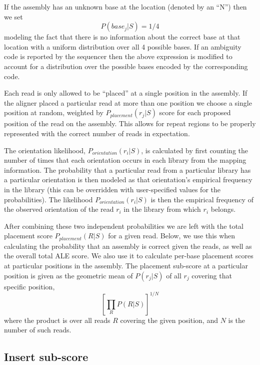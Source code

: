 \documentclass[phd,tocprelim]{cornell}
\begin{document}
If the assembly has an unknown base at the location (denoted by an “N”) then we set
\begin{equation}
    P\left(base_{j}|S\right) = 1/4
\end{equation}
modeling the fact that there is no information about the correct base at that location with a uniform distribution over all 4 possible bases. If an ambiguity code is reported by the sequencer then the above expression is modified to account for a distribution over the possible bases encoded by the corresponding code.

Each read is only allowed to be “placed” at a single position in the assembly. If the aligner placed a particular read at more than one position we choose a single position at random, weighted by $P_{placement}(r_{j}|S)$ score for each proposed position of the read on the assembly. This allows for repeat regions to be properly represented with the correct number of reads in expectation.

The orientation likelihood, $P_{orientation}\left(r_{i}|S\right)$, is calculated by first counting the number of times that each orientation occurs in each library from the mapping information.  The probability that a particular read from a particular library has a particular orientation is then modeled as that orientation’s empirical frequency in the library (this can be overridden with user-specified values for the probabilities).   The likelihood $P_{orientation}\left(r_{i}|S\right)$ is then the empirical frequency of the observed orientation of the read $r_{i}$ in the library from which $r_{i}$ belongs.

After combining these two independent probabilities we are left with the total placement score $P_{placement}(R|S)$ for a given read.  Below, we use this when calculating the probability that an assembly is correct given the reads, as well as the overall total ALE score.  We also use it to calculate per-base placement scores at particular positions in the assembly.  The placement sub-score at a particular position is given as the geometric mean of $P(r_{j}|S)$ of all $r_{j}$ covering that specific position,
\begin{equation}
    \left[\prod_{R}P(R|S)\right]^{1/N}
\end{equation}
where the product is over all reads $R$ covering the given position, and $N$ is the number of such reads.


\subsection{Insert sub-score} %
\label{sub:Insert sub-score}
\end{document}
